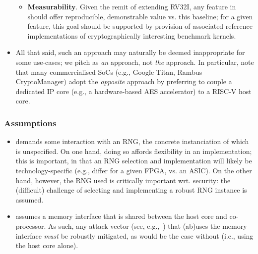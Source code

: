 \begin{itemize}
\begin{itemize}
      \item {\bf    Measurability}.
            Given the remit of extending RV32I, any feature in \ISE should 
            offer reproducible, demonstrable value vs. this baseline; for 
            a given feature, this goal should be supported by provision of 
            associated reference implementations of cryptographically 
            interesting benchmark kernels.

      \end{itemize}

\item All that said, such an approach may naturally be deemed inappropriate 
      for some use-cases; we pitch \ISE as {\em an} approach, not {\em the}
      approach.  In particular, note that many commercialised SoCs 
      (e.g., Google Titan, Rambus CryptoManager) 
      adopt the {\em opposite} approach by preferring to couple a dedicated
      IP core 
      (e.g., a hardware-based AES accelerator) 
      to a RISC-V host core.

\end{itemize}


\subsubsection{Assumptions}

\begin{itemize}

\item \ISE demands some interaction with an RNG, the concrete instanciation 
      of which is unspecified.
      On one hand, doing so affords flexibility in an implementation; this 
      is important, in that an RNG selection and implementation will likely 
      be technology-specific (e.g., differ for a given FPGA, vs. an ASIC).  
      On the other hand, however, the RNG used is critically important wrt. 
      security: the (difficult) challenge of selecting and implementing 
      a robust RNG instance is assumed.

\item \ISE assumes a memory interface that is shared between the host core 
      and co-processor.  As such, any attack vector
      (see, e.g.,~\cite{SCARV:GYCH:18})
      that (ab)uses the memory interface {\em must} be robustly mitigated, 
      as would be the case without \ISE (i.e., using the host core alone).

\end{itemize}

